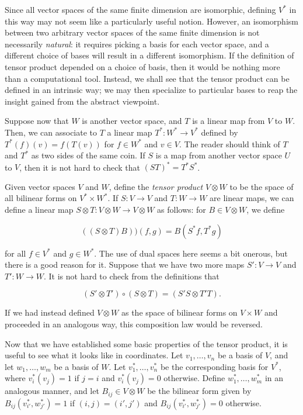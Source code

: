 \documentclass[11pt]{article}
\begin{document}
Since all vector spaces of the same finite dimension are isomorphic,
defining $V^*$ in this way may not seem like a particularly useful
notion. However, an isomorphism between two arbitrary vector spaces of
the same finite dimension is not necessarily \emph{natural}: it
requires picking a basis for each vector space, and a different choice
of bases will result in a different isomorphism. If the definition of
tensor product depended on a choice of basis, then it would be nothing
more than a computational tool. Instead, we shall see that the tensor
product can be defined in an intrinsic way; we may then specialize to
particular bases to reap the insight gained from the abstract
viewpoint.

Suppose now that $W$ is another vector space, and $T$ is a linear map
from $V$ to $W$. Then, we can associate to $T$ a linear map $T^* : W^*
\to V^*$ defined by $T^*(f)(v) = f(T(v))$ for $f \in W^*$ and $v \in
V$. The reader should think of $T$ and $T^*$ as two sides of the same
coin. If $S$ is a map from another vector space $U$ to $V$, then it is
not hard to check that $(ST)^* = T^*S^*$.

Given vector spaces $V$ and $W$, define the \emph{tensor product} $V
\otimes W$ to be the space of all bilinear forms on $V^* \times
W^*$. If $S : V \to V$ and $T : W \to W$ are linear maps, we can
define a linear map $S \otimes T : V \otimes W \to V \otimes W$ as
follows: for $B \in V \otimes W$, we define

\[ ((S \otimes T) B))(f, g) = B(S^*f, T^*g) \]

for all $f \in V^*$ and $g \in W^*$. The use of dual spaces here seems
a bit onerous, but there is a good reason for it. Suppose that we have
two more maps $S' : V \to V$ and $T' : W \to W$. It is not hard to
check from the definitions that

\[ (S' \otimes T') \circ (S \otimes T) = (S'S \otimes T'T). \]

If we had instead defined $V \otimes W$ as the space of bilinear forms
on $V \times W$ and proceeded in an analogous way, this composition
law would be reversed.

Now that we have established some basic properties of the tensor
product, it is useful to see what it looks like in coordinates. Let
$v_1, \ldots , v_n$ be a basis of $V$, and let $w_1, \ldots, w_m$ be a
basis of $W$. Let $v^*_1, \ldots , v^*_n$ be the corresponding basis
for $V^*$, where $v^*_i(v_j) = 1$ if $j = i$ and $v^*_i(v_j) = 0$
otherwise. Define $w^*_1, \ldots , w^*_m$ in an analogous manner, and
let $B_{ij} \in V \otimes W$ be the bilinear form given by
$B_{ij}(v^*_{i'}, w^*_{j'}) = 1$ if $(i, j) = (i', j')$ and
$B_{ij}(v^*_{i'}, w^*_{j'}) = 0$ otherwise.
\end{document}
